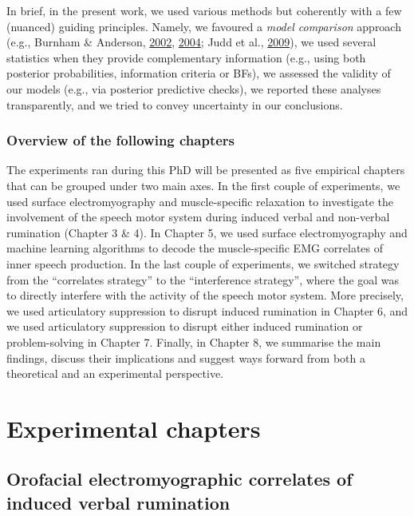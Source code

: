 \documentclass[a4paper,12pt,twoside,openright,oldfontcommands]{memoir}
\begin{document}
In brief, in the present work, we used various methods but coherently with a few (nuanced) guiding principles. Namely, we favoured a \emph{model comparison} approach (e.g., Burnham \& Anderson, \protect\hyperlink{ref-burnham_model_2002}{2002}, \protect\hyperlink{ref-burnham_multimodel_2004}{2004}; Judd et al., \protect\hyperlink{ref-judd_data_2009}{2009}), we used several statistics when they provide complementary information (e.g., using both posterior probabilities, information criteria or BFs), we assessed the validity of our models (e.g., via posterior predictive checks), we reported these analyses transparently, and we tried to convey uncertainty in our conclusions.

\hypertarget{overview-of-the-following-chapters}{%
\section{Overview of the following chapters}\label{overview-of-the-following-chapters}}

The experiments ran during this PhD will be presented as five empirical chapters that can be grouped under two main axes. In the first couple of experiments, we used surface electromyography and muscle-specific relaxation to investigate the involvement of the speech motor system during induced verbal and non-verbal rumination (Chapter 3 \& 4). In Chapter 5, we used surface electromyography and machine learning algorithms to decode the muscle-specific EMG correlates of inner speech production. In the last couple of experiments, we switched strategy from the \enquote{correlates strategy} to the \enquote{interference strategy}, where the goal was to directly interfere with the activity of the speech motor system. More precisely, we used articulatory suppression to disrupt induced rumination in Chapter 6, and we used articulatory suppression to disrupt either induced rumination or problem-solving in Chapter 7. Finally, in Chapter 8, we summarise the main findings, discuss their implications and suggest ways forward from both a theoretical and an experimental perspective.

\hypertarget{part-experimental-chapters}{%
\part{Experimental chapters}\label{part-experimental-chapters}}

\hypertarget{orofacial-electromyographic-correlates-of-induced-verbal-rumination}{%
\chapter{Orofacial electromyographic correlates of induced verbal rumination}\label{orofacial-electromyographic-correlates-of-induced-verbal-rumination}}
\end{document}
